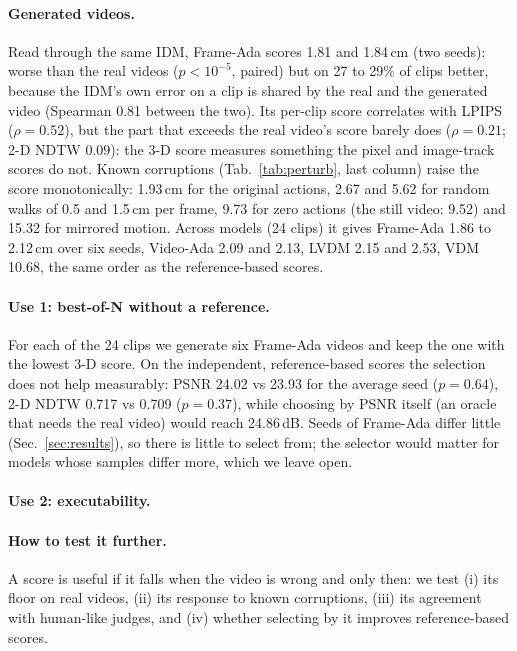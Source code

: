 \paragraph{Generated videos.}
Read through the same IDM, Frame-Ada scores 1.81 and 1.84\,cm (two seeds): worse than the real videos ($p<10^{-5}$, paired) but on 27 to 29\% of clips better, because the IDM's own error on a clip is shared by the real and the generated video (Spearman 0.81 between the two).
Its per-clip score correlates with LPIPS ($\rho=0.52$), but the part that exceeds the real video's score barely does ($\rho=0.21$; 2-D NDTW $0.09$): the 3-D score measures something the pixel and image-track scores do not.
Known corruptions (Tab.~\ref{tab:perturb}, last column) raise the score monotonically: 1.93\,cm for the original actions, 2.67 and 5.62 for random walks of 0.5 and 1.5\,cm per frame, 9.73 for zero actions (the still video: 9.52) and 15.32 for mirrored motion.
Across models (24 clips) it gives Frame-Ada 1.86 to 2.12\,cm over six seeds, Video-Ada 2.09 and 2.13, LVDM 2.15 and 2.53, VDM 10.68, the same order as the reference-based scores.

\paragraph{Use 1: best-of-N without a reference.}
For each of the 24 clips we generate six Frame-Ada videos and keep the one with the lowest 3-D score.
On the independent, reference-based scores the selection does not help measurably: PSNR 24.02 vs 23.93 for the average seed ($p=0.64$), 2-D NDTW 0.717 vs 0.709 ($p=0.37$), while choosing by PSNR itself (an oracle that needs the real video) would reach 24.86\,dB.
Seeds of Frame-Ada differ little (Sec.~\ref{sec:results}), so there is little to select from; the selector would matter for models whose samples differ more, which we leave open.

\paragraph{Use 2: executability.}

\paragraph{How to test it further.}
A score is useful if it falls when the video is wrong and only then: we test (i) its floor on real videos, (ii) its response to known corruptions, (iii) its agreement with human-like judges, and (iv) whether selecting by it improves reference-based scores.
